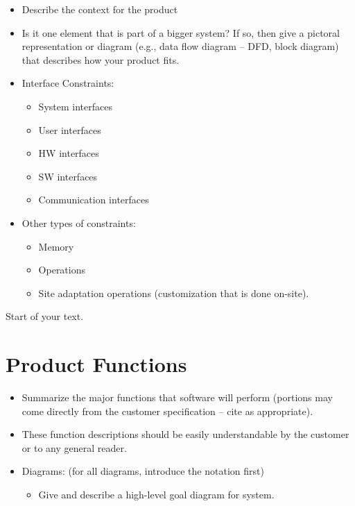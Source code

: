 \documentclass[12pt]{article}
\begin{document}
\begin{itemize}
\item
  Describe the context for the product
\item
  Is it one element that is part of a bigger system? If so, then give a
  pictoral representation or diagram (e.g., data flow diagram -- DFD,
  block diagram) that describes how your product fits.
\item
  Interface Constraints:

  \begin{itemize}
  \item
    System interfaces
  \item
    User interfaces
  \item
    HW interfaces
  \item
    SW interfaces
  \item
    Communication interfaces
  \end{itemize}
\item
  Other types of constraints:

  \begin{itemize}
  \item
    Memory
  \item
    Operations
  \item
    Site adaptation operations (customization that is done on-site).
  \end{itemize}
\end{itemize}

Start of your text.

\section{Product Functions}\label{product-functions}

\begin{itemize}
\item
  Summarize the major functions that software will perform (portions may
  come directly from the customer specification -- cite as appropriate).
\item
  These function descriptions should be easily understandable by the
  customer or to any general reader.
\item
  Diagrams: (for all diagrams, introduce the notation first)

  \begin{itemize}
  \item
    Give and describe a high-level goal diagram for system.
  \end{itemize}
\end{itemize}
\end{document}
